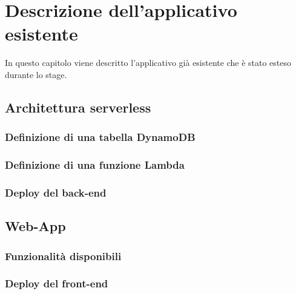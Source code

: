 
\chapter{Descrizione dell'applicativo esistente}
\label{cap:applicazione}

In questo capitolo viene descritto l'applicativo già esistente che è stato esteso durante lo stage.\\

\section{Architettura serverless}
	\subsection{Definizione di una tabella DynamoDB}
	\subsection{Definizione di una funzione Lambda}
	\subsection{Deploy del back-end}

\section{Web-App}
	\subsection{Funzionalità disponibili}
	\subsection{Deploy del front-end}